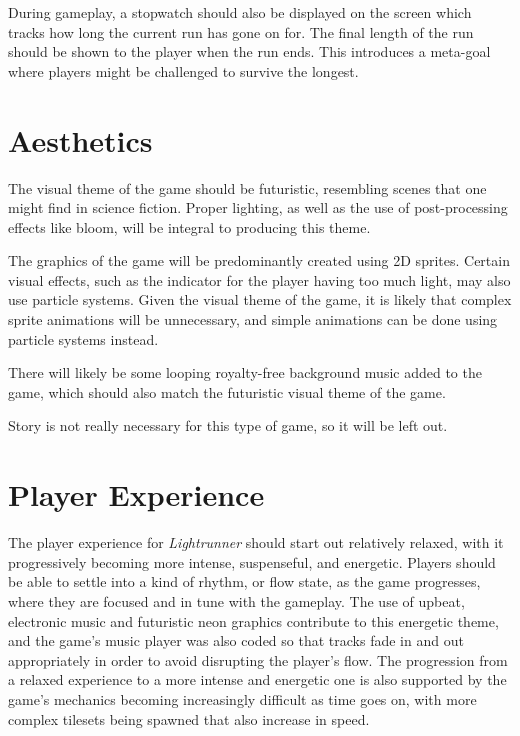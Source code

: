 \documentclass[10pt]{article}
\begin{document}
During gameplay, a stopwatch should also be displayed on the screen which tracks how long the current run has gone on for.
The final length of the run should be shown to the player when the run ends. This introduces a meta-goal where
players might be challenged to survive the longest.

\section{Aesthetics}

The visual theme of the game should be futuristic, resembling scenes that one might find in science fiction.
Proper lighting, as well as the use of post-processing effects like bloom, will be integral to producing this theme.

The graphics of the game will be predominantly created using 2D sprites. Certain visual effects, such as the indicator
for the player having too much light, may also use particle systems. Given the visual theme of the game, it is likely
that complex sprite animations will be unnecessary, and simple animations can be done using particle systems instead.

There will likely be some looping royalty-free background music added to the game,
which should also match the futuristic visual theme of the game.

Story is not really necessary for this type of game, so it will be left out.

\section{Player Experience}

The player experience for \textit{Lightrunner} should start out relatively relaxed, with it progressively becoming
more intense, suspenseful, and energetic. Players should be able to settle into a kind of rhythm, or flow state,
as the game progresses, where they are focused and in tune with the gameplay. The use of upbeat, electronic music
and futuristic neon graphics contribute to this energetic theme, and the game's music player was also coded so
that tracks fade in and out appropriately in order to avoid disrupting the player's flow.
The progression from a relaxed experience to a more intense and energetic one is also supported by the game's mechanics
becoming increasingly difficult as time goes on, with more complex tilesets being spawned that also increase in speed.
\end{document}
